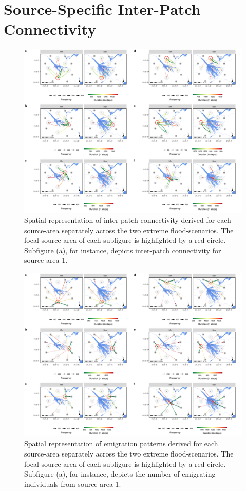 \documentclass[abstract=on,10pt,a4paper,bibliography=totocnumbered]{article}
\begin{document}
\section{Source-Specific Inter-Patch Connectivity}
\begin{figure}[htbp]
  \begin{center}
  \includegraphics[width = \textwidth]{99_IPCMain.png}
  \caption{Spatial representation of inter-patch connectivity derived for each
  source-area separately across the two extreme flood-scenarios. The focal
  source area of each subfigure is highlighted by a red circle. Subfigure (a),
  for instance, depicts inter-patch connectivity for source-area 1.}
  \label{IPCMain}
  \end{center}
\end{figure}

\newpage
\begin{figure}[htbp]
  \begin{center}
  \includegraphics[width = \textwidth]{99_IPCBuffer.png}
  \caption{Spatial representation of emigration patterns derived for each
  source-area separately across the two extreme flood-scenarios. The focal
  source area of each subfigure is highlighted by a red circle. Subfigure (a),
  for instance, depicts the number of emigrating individuals from source-area
  1.}
  \label{IPCBuffer}
  \end{center}
\end{figure}
\end{document}
